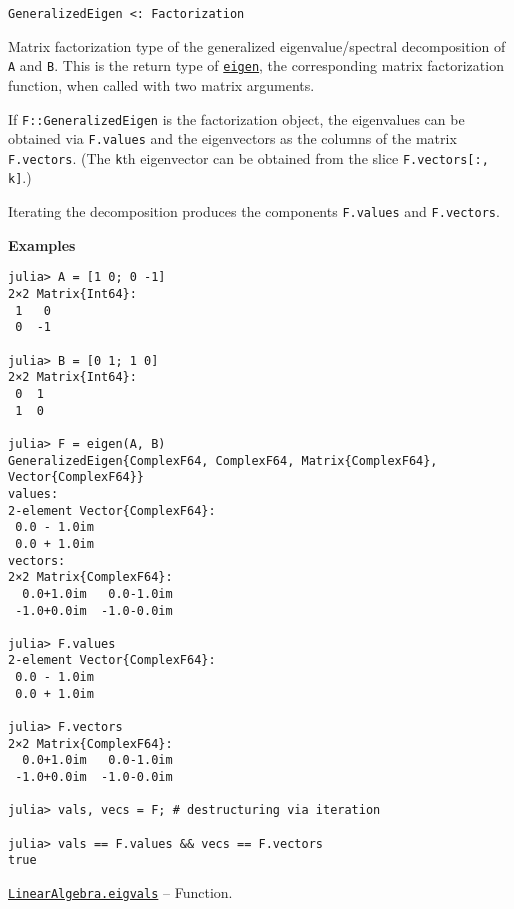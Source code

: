 \begin{adjustwidth}{2em}{0pt}


\begin{verbatim}
GeneralizedEigen <: Factorization
\end{verbatim}

Matrix factorization type of the generalized eigenvalue/spectral decomposition of \texttt{A} and \texttt{B}. This is the return type of \hyperlink{11056016707394839114}{\texttt{eigen}}, the corresponding matrix factorization function, when called with two matrix arguments.

If \texttt{F::GeneralizedEigen} is the factorization object, the eigenvalues can be obtained via \texttt{F.values} and the eigenvectors as the columns of the matrix \texttt{F.vectors}. (The \texttt{k}th eigenvector can be obtained from the slice \texttt{F.vectors[:, k]}.)

Iterating the decomposition produces the components \texttt{F.values} and \texttt{F.vectors}.

\textbf{Examples}


\begin{verbatim}
julia> A = [1 0; 0 -1]
2×2 Matrix{Int64}:
 1   0
 0  -1

julia> B = [0 1; 1 0]
2×2 Matrix{Int64}:
 0  1
 1  0

julia> F = eigen(A, B)
GeneralizedEigen{ComplexF64, ComplexF64, Matrix{ComplexF64}, Vector{ComplexF64}}
values:
2-element Vector{ComplexF64}:
 0.0 - 1.0im
 0.0 + 1.0im
vectors:
2×2 Matrix{ComplexF64}:
  0.0+1.0im   0.0-1.0im
 -1.0+0.0im  -1.0-0.0im

julia> F.values
2-element Vector{ComplexF64}:
 0.0 - 1.0im
 0.0 + 1.0im

julia> F.vectors
2×2 Matrix{ComplexF64}:
  0.0+1.0im   0.0-1.0im
 -1.0+0.0im  -1.0-0.0im

julia> vals, vecs = F; # destructuring via iteration

julia> vals == F.values && vecs == F.vectors
true
\end{verbatim}



\end{adjustwidth}
\hypertarget{12334018763942871611}{}
\hyperlink{12334018763942871611}{\texttt{LinearAlgebra.eigvals}}  -- {Function.}

